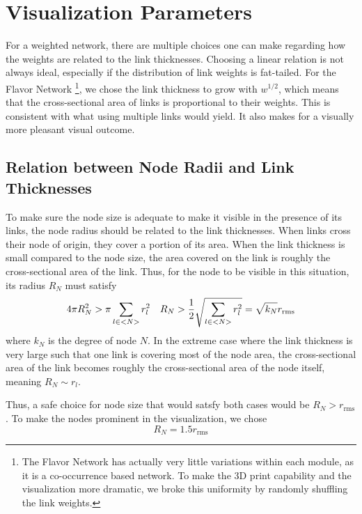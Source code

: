 \documentclass[endfloats,nofootinbib,preprint,floatfix,titlepage,superscriptaddress]{revtex4} %
\begin{document}
\section{Visualization Parameters\label{ap:params}}
For a weighted network, there are multiple choices one can make regarding how the weights are related to the link thicknesses.
Choosing a linear relation is not always ideal, especially if the distribution of link weights is fat-tailed. 
For the Flavor Network \citep{ahn2011flavor}\footnote{The Flavor Network has actually very little variations within each module, as it is a co-occurrence based network. To make the 3D print capability and the visualization more dramatic, we broke this uniformity by randomly shuffling the link weights.}, we chose the link thickness to grow with $w^{1/2}$, which means that the cross-sectional area of links is proportional to their weights. 
This is consistent with what using multiple links would yield. 
It also makes for a  visually more pleasant visual outcome. 



\subsection{Relation between Node Radii and Link Thicknesses}
To make sure the node size is adequate to make it visible in the presence of its links, the node radius should be related to the link thicknesses. 
When links cross their node of origin, they cover a portion of its area.
When the link thickness is small compared to the node size, the area covered on the link is roughly the cross-sectional area of the link. 
Thus, for the node to be visible in this situation, its radius $R_N$ must satisfy
\begin{equation}
    4 \pi R_N^2 > \pi \sum_{l\in <N>} r_l^2 \quad R_N > {1\over 2} \sqrt{\sum_{l\in <N>} r_l^2} = \sqrt{k_N} r_{\mathrm{rms}}  
\end{equation}
where $k_N$ is the degree of node $N$.  
In the extreme case where the link thickness is very large such that one link is covering most of the node area, the cross-sectional area of the link becomes roughly the cross-sectional area of the node itself, meaning $R_N \sim r_l$. 

Thus, a safe choice for node size that would satsfy both cases would be 
$R_N > r_{\mathrm{rms}}$.
To make the nodes prominent in the visualization, we chose 
\[R_N = 1.5 r_{\mathrm{rms}}\]
\end{document}
